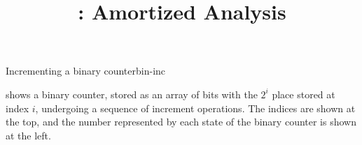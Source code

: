 \documentclass{tufte-handout}
\title{\thecourse: Amortized Analysis}
\date{}
\begin{document}
\maketitle


\begin{model*}{Incrementing a binary counter}{bin-inc}
  \begin{center}
    
  \end{center}
\end{model*}

 shows a binary counter, stored as an array of
bits with the $2^i$ place stored at index $i$, undergoing a sequence of increment operations. The indices
are shown at the top, and the number represented by each state of the
binary counter is shown at the left.
\end{document}
